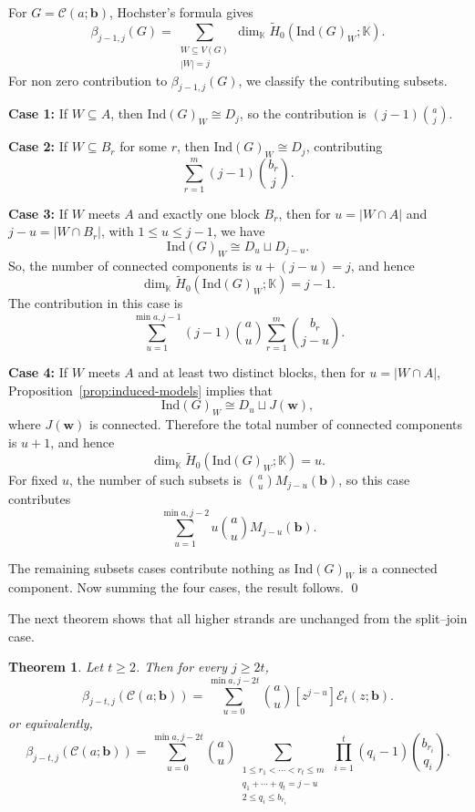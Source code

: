\documentclass[12pt]{article}
\renewenvironment{proof}{{\bf \noindent Proof.}}{\qed}
\newtheorem{theorem}{Theorem}[section]
\theoremstyle{definition}
\theoremstyle{remark}
\newcommand{\kk}{\mathbb{K}}
\newcommand{\EE}{\mathcal{E}}
\newcommand{\CC}{\mathcal{C}}
\newcommand{\ind}{\mathrm{Ind}}
\newcommand{\bk}[1]{\mathbf{#1}}
\newcommand{\wt}{\widetilde}
\begin{document}
	\begin{proof}
		For $G=\CC(a;\bk{b})$, Hochster's formula gives
		$$
		\beta_{j-1,j}(G)=\sum_{\substack{W\subseteq V(G)\\ |W|=j}}
		\dim_{\kk}\wt H_0(\ind(G)_W;\kk).
		$$
		For non zero contribution to $\beta_{j-1,j}(G) $, we classify the contributing subsets.
		
		\smallskip
		
		\noindent\textbf{Case 1:} If $W\subseteq A$, then $\ind(G)_W\cong D_j$, so the contribution is $(j-1)\binom{a}{j}$.
		
		\smallskip
		
		\noindent\textbf{Case 2:} If $W\subseteq B_r$ for some $r$, then $\ind(G)_W\cong D_j$, contributing
		$$
		\sum_{r=1}^m (j-1)\binom{b_r}{j}.
		$$
		
		\smallskip
		
		\noindent\textbf{Case 3:} If $W$ meets $A$ and exactly one block $B_r$, then for $u=|W\cap A|$ and $j-u=|W\cap B_r|$, with $1\leq u\leq j-1$, we have
		$$
		\ind(G)_W\cong D_u\sqcup D_{j-u}.
		$$
		So, the number of connected components is $u+(j-u)=j$, and hence
		$$
		\dim_{\kk}\wt H_0(\ind(G)_W;\kk)=j-1.
		$$
		The contribution in this case is
		$$
		\sum_{u=1}^{\min{a,j-1}}
		(j-1)\binom{a}{u}\sum_{r=1}^m \binom{b_r}{j-u}.
		$$
		
		\smallskip
		
		\noindent\textbf{Case 4:} If $W$ meets $A$ and at least two distinct blocks, then for $u=|W\cap A|$,  Proposition~\ref{prop:induced-models} implies that
		$$
		\ind(G)_W\cong D_u\sqcup J(\bk{w}),
		$$
		where $J(\bk{w})$ is connected. Therefore the total number of connected components is $u+1$, and hence
		$$
		\dim_{\kk}\wt H_0(\ind(G)_W;\kk)=u.
		$$
		For fixed $u$, the number of such subsets is $\binom{a}{u}M_{j-u}(\bk{b})$, so this case contributes
		$$
		\sum_{u=1}^{\min{a,j-2}}
		u\binom{a}{u}M_{j-u}(\bk{b}).
		$$
		
		\smallskip
		 The remaining subsets cases contribute nothing as $\ind(G)_W$ is a connected component. Now summing the four cases,  the result follows.
	\end{proof}
	
	 \medskip The next theorem shows that all higher strands are unchanged from the split--join case.
	
	\begin{theorem}\label{thm:clique-higher}
		Let $t\geq 2$. Then for every $j\geq 2t$,
		$$
		\beta_{j-t,j}(\CC(a;\bk{b}))
		= \sum_{u=0}^{\min{a,j-2t}}
		\binom{a}{u}[z^{j-u}]\EE_t(z;\bk{b}).
		$$
		or equivalently,
		$$
		\beta_{j-t,j}(\CC(a;\bk{b}))
		= \sum_{u=0}^{\min{a,j-2t}}
		\binom{a}{u}
		\sum_{\substack{1\leq r_1<\cdots<r_t\leq m\\
				q_1+\cdots+q_t=j-u\\
				2\leq q_i\leq b_{r_i}}}\,
		\prod_{i=1}^t (q_i-1)\binom{b_{r_i}}{q_i}.
		$$
	\end{theorem}
	
\end{document}
